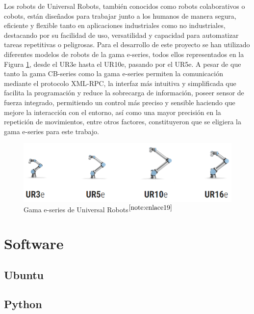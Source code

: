 Los robots de Universal Robots, también conocidos como robots colaborativos o cobots, están diseñados para trabajar junto a los humanos de manera segura, eficiente y flexible tanto en aplicaciones industriales como no industriales, destacando por su facilidad de uso, versatilidad y capacidad para automatizar tareas repetitivas o peligrosas. 
Para el desarrollo de este proyecto se han utilizado diferentes modelos de robots de la gama e-series, todos ellos representados en la Figura \ref{fig:Gama_e-series}, desde el UR3e hasta el UR10e, pasando por el UR5e.
A pesar de que tanto la gama CB-series como la gama e-series permiten la comunicación mediante el protocolo XML-RPC, la interfaz más intuitiva y simplificada que facilita la programación y reduce la sobrecarga de información, poseer sensor de fuerza integrado, permitiendo un control más preciso y sensible haciendo que mejore la interacción con el entorno, así como una mayor precisión en la repetición de movimientos, entre otros factores, constituyeron que se eligiera la gama e-series para este trabajo.

\begin{figure} [H]
    \begin{center}
      \includegraphics[width=15cm]{figs/Gama e-series.png}
    \end{center}
    \caption{Gama e-series de Universal Robots$^{\ref{note:enlace19}}$}
    \label{fig:Gama_e-series}
\end{figure}

\setcounter{footnote}{19} 


\section{Software}
\label{sec:software}

\subsection{Ubuntu}
\label{sec:ubuntu}

\subsection{Python}
\label{sec:python}

